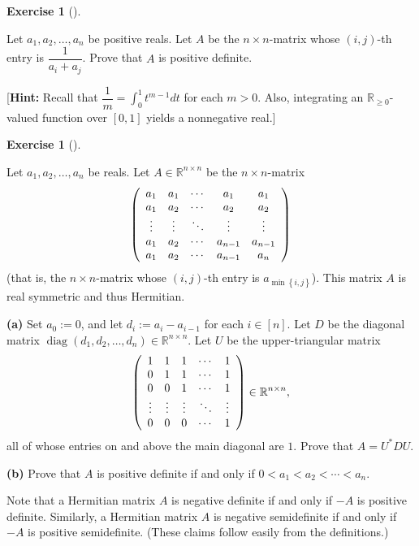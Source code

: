 \documentclass[numbers=enddot,12pt,final,onecolumn,notitlepage]{scrartcl}%
\newcounter{exer}
\numberwithin{exer}{subsection}
\theoremstyle{definition}
\newtheorem{exmp}[exer]{Exercise}
\newenvironment{exercise}[1][]
{\begin{exmp}[#1]\begin{leftbar}}
{\end{leftbar}\end{exmp}}
\begin{document}
\begin{exercise}
 Let $a_{1},a_{2},\ldots,a_{n}$ be positive reals. Let $A$ be the
$n\times n$-matrix whose $\left(  i,j\right)  $-th entry is $\dfrac{1}%
{a_{i}+a_{j}}$. Prove that $A$ is positive definite. \medskip

[\textbf{Hint:} Recall that $\dfrac{1}{m}=\int_{0}^{1}t^{m-1}dt$ for each
$m>0$. Also, integrating an $\mathbb{R}_{\geq0}$-valued function over $\left[
0,1\right]  $ yields a nonnegative real.]
\end{exercise}

\begin{exercise}
 Let $a_{1},a_{2},\ldots,a_{n}$ be reals. Let $A\in\mathbb{R}^{n\times
n}$ be the $n\times n$-matrix%
\[
\left(
\begin{array}
[c]{ccccc}%
a_{1} & a_{1} & \cdots & a_{1} & a_{1}\\
a_{1} & a_{2} & \cdots & a_{2} & a_{2}\\
\vdots & \vdots & \ddots & \vdots & \vdots\\
a_{1} & a_{2} & \cdots & a_{n-1} & a_{n-1}\\
a_{1} & a_{2} & \cdots & a_{n-1} & a_{n}%
\end{array}
\right)
\]
(that is, the $n\times n$-matrix whose $\left(  i,j\right)  $-th entry is
$a_{\min\left\{  i,j\right\}  }$). This matrix $A$ is real symmetric and thus
Hermitian. \medskip

\textbf{(a)} Set $a_{0}:=0$, and let $d_{i}:=a_{i}-a_{i-1}$ for each
$i\in\left[  n\right]  $. Let $D$ be the diagonal matrix $\operatorname*{diag}%
\left(  d_{1},d_{2},\ldots,d_{n}\right)  \in\mathbb{R}^{n\times n}$. Let $U$
be the upper-triangular matrix
\[
\left(
\begin{array}
[c]{ccccc}%
1 & 1 & 1 & \cdots & 1\\
0 & 1 & 1 & \cdots & 1\\
0 & 0 & 1 & \cdots & 1\\
\vdots & \vdots & \vdots & \ddots & \vdots\\
0 & 0 & 0 & \cdots & 1
\end{array}
\right)  \in\mathbb{R}^{n\times n},
\]
all of whose entries on and above the main diagonal are $1$. Prove that
$A=U^{\ast}DU$. \medskip

\textbf{(b)} Prove that $A$ is positive definite if and only if $0<a_{1}%
<a_{2}<\cdots<a_{n}$.
\end{exercise}

Note that a Hermitian matrix $A$ is negative definite if and only if $-A$ is
positive definite. Similarly, a Hermitian matrix $A$ is negative semidefinite
if and only if $-A$ is positive semidefinite. (These claims follow easily from
the definitions.)
\end{document}
